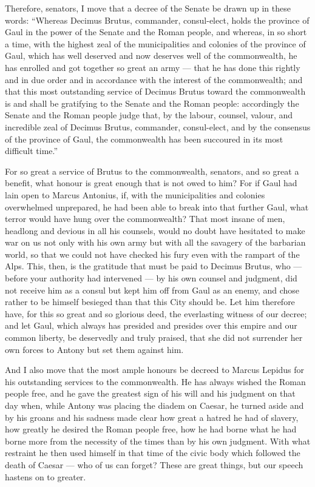  Therefore, senators, I move that a decree of the Senate be drawn up in these words: ``Whereas Decimus Brutus, commander, consul-elect, holds the province of Gaul in the power of the Senate and the Roman people, and whereas, in so short a time, with the highest zeal of the municipalities and colonies of the province of Gaul, which has well deserved and now deserves well of the commonwealth, he has enrolled and got together so great an army --- that he has done this rightly and in due order and in accordance with the interest of the commonwealth; and that this most outstanding service of Decimus Brutus toward the commonwealth is and shall be gratifying to the Senate and the Roman people: accordingly the Senate and the Roman people judge that, by the labour, counsel, valour, and incredible zeal of Decimus Brutus, commander, consul-elect, and by the consensus of the province of Gaul, the commonwealth has been succoured in its most difficult time.''

 For so great a service of Brutus to the commonwealth, senators, and so great a benefit, what honour is great enough that is not owed to him? For if Gaul had lain open to Marcus Antonius, if, with the municipalities and colonies overwhelmed unprepared, he had been able to break into that further Gaul, what terror would have hung over the commonwealth? That most insane of men, headlong and devious in all his counsels, would no doubt have hesitated to make war on us not only with his own army but with all the savagery of the barbarian world, so that we could not have checked his fury even with the rampart of the Alps. This, then, is the gratitude that must be paid to Decimus Brutus, who --- before your authority had intervened --- by his own counsel and judgment, did not receive him as a consul but kept him off from Gaul as an enemy, and chose rather to be himself besieged than that this City should be. Let him therefore have, for this so great and so glorious deed, the everlasting witness of our decree; and let Gaul, which always has presided and presides over this empire and our common liberty, be deservedly and truly praised, that she did not surrender her own forces to Antony but set them against him.

 And I also move that the most ample honours be decreed to Marcus Lepidus for his outstanding services to the commonwealth. He has always wished the Roman people free, and he gave the greatest sign of his will and his judgment on that day when, while Antony was placing the diadem on Caesar, he turned aside and by his groans and his sadness made clear how great a hatred he had of slavery, how greatly he desired the Roman people free, how he had borne what he had borne more from the necessity of the times than by his own judgment. With what restraint he then used himself in that time of the civic body which followed the death of Caesar --- who of us can forget? These are great things, but our speech hastens on to greater.

